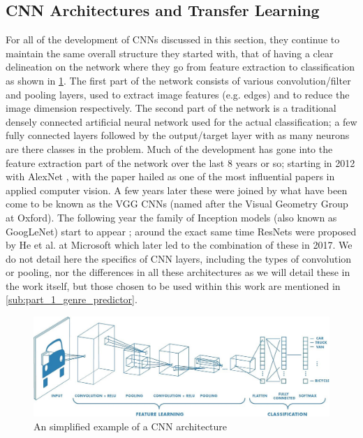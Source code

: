 \documentclass[12pt]{article}
\numberwithin{equation}{section}
\numberwithin{figure}{section}
\begin{document}
\subsection{CNN Architectures and Transfer Learning}
\label{sub:cnn_architecture}
For all of the development of CNNs discussed in this section, they continue to maintain the same overall structure they started with, that of having a clear delineation on the network where they go from feature extraction to classification as shown in \cref{fig:cnn_struct}. The first part of the network consists of various convolution/filter and pooling layers, used to extract image features (e.g. edges) and to reduce the image dimension respectively. The second part of the network is a traditional densely connected artificial neural network used for the actual classification; a few fully connected layers followed by the output/target layer with as many neurons are there classes in the problem. Much of the development has gone into the feature extraction part of the network over the last 8 years or so; starting in 2012 with AlexNet \cite{Krizhevsky2017}, with the paper hailed as one of the most influential papers in applied computer vision. A few years later these were joined by what have been come to be known as the VGG CNNs (named after the Visual Geometry Group at Oxford)\cite{Simonyan2015}. The following year the family of Inception models (also known as GoogLeNet) start to appear \cite{Szegedy}; around the exact same time ResNets were proposed by He et al. at Microsoft \cite{He2015} which later led to the combination of these in 2017. We do not detail here the specifics of CNN layers, including the types of convolution or pooling, nor the differences in all these architectures as we will detail these in the work itself, but those chosen to be used within this work are mentioned in \cref{sub:part_1_genre_predictor}. 

\begin{figure}
	\centering
	\captionsetup{justification=centering}
	\includegraphics[scale=0.3]{cnn_struct.jpeg}
	\caption{An simplified example of a CNN architecture}
	\label{fig:cnn_struct}
\end{figure}
\end{document}
